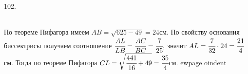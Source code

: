 102. \begin{figure}[ht!]
\end{figure}\\
По теореме Пифагора имеем $AB=\sqrt{625-49}=24$см. По свойству основания биссектрисы получаем соотношение $\cfrac{AL}{LB}=\cfrac{AC}{BC}=\cfrac{7}{25},$ значит $AL=\cfrac{7}{32}\cdot24=\cfrac{21}{4}$см. Тогда  по теореме Пифагора $CL=\sqrt{\cfrac{441}{16}+49}=\cfrac{35}{4}$см.
ewpage
oindent
